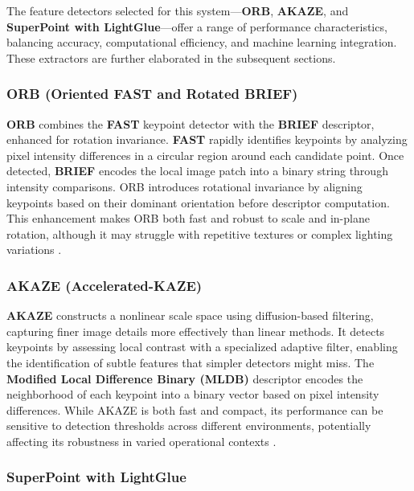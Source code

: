 The feature detectors selected for this system—\textbf{ORB}, \textbf{AKAZE}, and \textbf{SuperPoint with LightGlue}—offer a range of performance characteristics, balancing accuracy, computational efficiency, and machine learning integration. These extractors are further elaborated in the subsequent sections.

\subsubsection{ORB (Oriented FAST and Rotated BRIEF)}

\textbf{ORB} combines the \textbf{FAST} keypoint detector with the \textbf{BRIEF} descriptor, enhanced for rotation invariance. \textbf{FAST} rapidly identifies keypoints by analyzing pixel intensity differences in a circular region around each candidate point. Once detected, \textbf{BRIEF} encodes the local image patch into a binary string through intensity comparisons. ORB introduces rotational invariance by aligning keypoints based on their dominant orientation before descriptor computation. This enhancement makes ORB both fast and robust to scale and in-plane rotation, although it may struggle with repetitive textures or complex lighting variations \cite{opencv_orb_tutorial}.

\subsubsection{AKAZE (Accelerated-KAZE)}

\textbf{AKAZE} constructs a nonlinear scale space using diffusion-based filtering, capturing finer image details more effectively than linear methods. It detects keypoints by assessing local contrast with a specialized adaptive filter, enabling the identification of subtle features that simpler detectors might miss. The \textbf{Modified Local Difference Binary (MLDB)} descriptor encodes the neighborhood of each keypoint into a binary vector based on pixel intensity differences. While AKAZE is both fast and compact, its performance can be sensitive to detection thresholds across different environments, potentially affecting its robustness in varied operational contexts \cite{opencv_akaze}. 

\subsubsection{SuperPoint with LightGlue}

